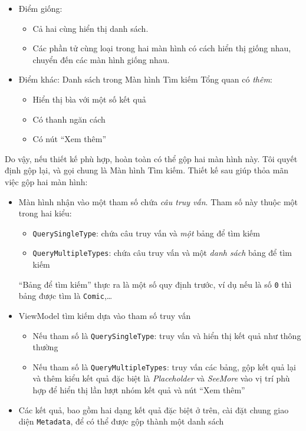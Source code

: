 \documentclass[
]{article}
\begin{document}
\begin{itemize}
\item
  Điểm giống:

  \begin{itemize}
    \item
    Cả hai cùng hiển thị danh sách.
  \item
    Các phần tử cùng loại trong hai màn hình có cách hiển thị giống
    nhau, chuyển đến các màn hình giống nhau.
  \end{itemize}
\item
  Điểm khác: Danh sách trong Màn hình Tìm kiếm Tổng quan có \emph{thêm}:

  \begin{itemize}
    \item
    Hiển thị bìa với một số kết quả
  \item
    Có thanh ngăn cách
  \item
    Có nút ``Xem thêm''
  \end{itemize}
\end{itemize}

Do vậy, nếu thiết kế phù hợp, hoàn toàn có thể gộp hai màn hình này. Tôi
quyết định gộp lại, và gọi chung là Màn hình Tìm kiếm. Thiết kế sau giúp
thỏa mãn việc gộp hai màn hình:

\begin{itemize}
\item
  Màn hình nhận vào một tham số chứa \emph{câu truy vấn}. Tham số này
  thuộc một trong hai kiểu:

  \begin{itemize}
    \item
    \texttt{QuerySingleType}: chứa câu truy vấn và \emph{một} bảng để
    tìm kiếm
  \item
    \texttt{QueryMultipleTypes}: chứa câu truy vấn và một \emph{danh
    sách} bảng để tìm kiếm
  \end{itemize}

  ``Bảng để tìm kiếm'' thực ra là một số quy định trước, ví dụ nếu là số
  \texttt{0} thì bảng được tìm là \texttt{Comic},\ldots{}
\item
  ViewModel tìm kiếm dựa vào tham số truy vấn

  \begin{itemize}
    \item
    Nếu tham số là \texttt{QuerySingleType}: truy vấn và hiển thị kết
    quả như thông thường
  \item
    Nếu tham số là \texttt{QueryMultipleTypes}: truy vấn các bảng, gộp
    kết quả lại và thêm kiểu kết quả đặc biệt là \emph{Placeholder} và
    \emph{SeeMore} vào vị trí phù hợp để hiển thị lần lượt nhóm kết quả
    và nút ``Xem thêm''
  \end{itemize}
\item
  Các kết quả, bao gồm hai dạng kết quả đặc biệt ở trên, cài đặt chung
  giao diện \texttt{Metadata}, để có thể được gộp thành một danh sách
\end{itemize}
\end{document}
